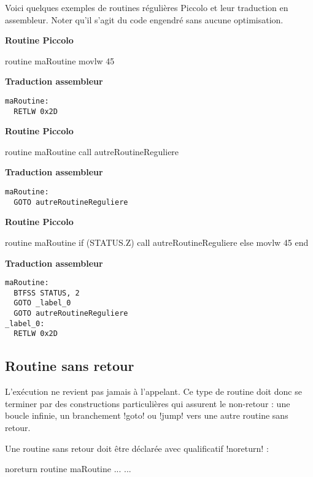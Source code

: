 Voici quelques exemples de routines régulières Piccolo et leur traduction en assembleur. Noter qu'il s'agit du code engendré sans aucune optimisation.
\begin{multicols}{2}
\textbf{Routine Piccolo}
\begin{piccolo}
routine maRoutine {
  movlw 45
}
\end{piccolo}
\columnbreak
\textbf{Traduction assembleur}
\begin{lstlisting}[language=assembleur]
maRoutine:
  RETLW 0x2D
\end{lstlisting}
\end{multicols}

\begin{multicols}{2}
\textbf{Routine Piccolo}
\begin{piccolo}
routine maRoutine {
  call autreRoutineReguliere
}
\end{piccolo}
\columnbreak
\textbf{Traduction assembleur}
\begin{lstlisting}[language=assembleur]
maRoutine:
  GOTO autreRoutineReguliere
\end{lstlisting}
\end{multicols}


\begin{multicols}{2}
\textbf{Routine Piccolo}
\begin{piccolo}
routine maRoutine {
  if (STATUS.Z)
    call autreRoutineReguliere
  else
    movlw 45
  end
}
\end{piccolo}
\columnbreak
\textbf{Traduction assembleur}
\begin{lstlisting}[language=assembleur]
maRoutine:
  BTFSS STATUS, 2
  GOTO _label_0
  GOTO autreRoutineReguliere
_label_0:
  RETLW 0x2D
\end{lstlisting}
\end{multicols}


\subsection{Routine sans retour}

L’exécution ne revient pas jamais à l’appelant. Ce type de routine doit donc se terminer par des constructions particulières qui assurent le non-retour : une boucle infinie, un branchement \pic!goto! ou \pic!jump! vers une autre routine sans retour.

Une routine sans retour doit être déclarée avec qualificatif \pic!noreturn! :
\begin{piccolo}
noreturn routine maRoutine ... {
  ...
}
\end{piccolo}

